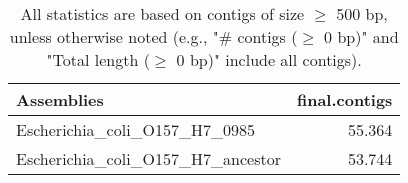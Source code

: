 \documentclass[12pt,a4paper]{article}
\begin{document}
\begin{table}[ht]
\begin{center}
\caption{All statistics are based on contigs of size $\geq$ 500 bp, unless otherwise noted (e.g., "\# contigs ($\geq$ 0 bp)" and "Total length ($\geq$ 0 bp)" include all contigs).}
\begin{tabular}{|l*{1}{|r}|}
\hline
Assemblies & final.contigs \\ \hline
Escherichia\_coli\_O157\_H7\_0985 & 55.364 \\ \hline
Escherichia\_coli\_O157\_H7\_ancestor & 53.744 \\ \hline
\end{tabular}
\end{center}
\end{table}
\end{document}
